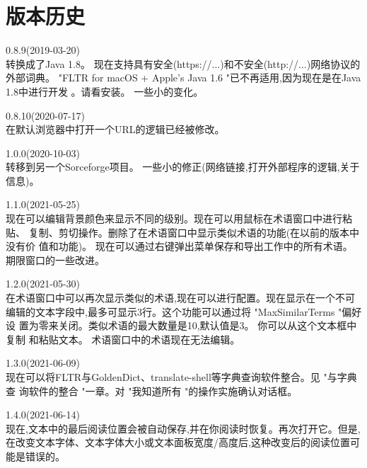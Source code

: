 \documentclass[cn,10pt,math=newtx,citestyle=gb7714-2015,bibstyle=gb7714-2015]{elegantbook}
\begin{document}
\chapter{版本历史}
\label{版本历史}
0.8.9(2019-03-20)\\
转换成了Java 1.8。
现在支持具有安全(https://...)和不安全(http://...)网络协议的外部词典。
"FLTR for macOS + Apple's Java 1.6 "已不再适用,因为现在是在Java 1.8中进行开发
。请看安装。
一些小的变化。

0.8.10(2020-07-17)\\
在默认浏览器中打开一个URL的逻辑已经被修改。

1.0.0(2020-10-03)\\
转移到另一个Sorceforge项目。
一些小的修正(网络链接,打开外部程序的逻辑,关于信息)。

1.1.0(2021-05-25)\\
现在可以编辑背景颜色来显示不同的级别。现在可以用鼠标在术语窗口中进行粘贴、
复制、剪切操作。删除了在术语窗口中显示类似术语的功能(在以前的版本中没有价
值和功能)。
现在可以通过右键弹出菜单保存和导出工作中的所有术语。
期限窗口的一些改进。

1.2.0(2021-05-30)\\
在术语窗口中可以再次显示类似的术语,现在可以进行配置。现在显示在一个不可
编辑的文本字段中,最多可显示3行。这个功能可以通过将 "MaxSimilarTerms "偏好设
置为零来关闭。类似术语的最大数量是10,默认值是3。 你可以从这个文本框中复制
和粘贴文本。
术语窗口中的术语现在无法编辑。

1.3.0(2021-06-09)\\
现在可以将FLTR与GoldenDict、translate-shell等字典查询软件整合。见 "与字典查
询软件的整合 "一章。对 "我知道所有 "的操作实施确认对话框。

1.4.0(2021-06-14)\\
现在,文本中的最后阅读位置会被自动保存,并在你阅读时恢复。再次打开它。但是,在改变文本字体、文本字体大小或文本面板宽度/高度后,这种改变后的阅读位置可能是错误的。
\end{document}
